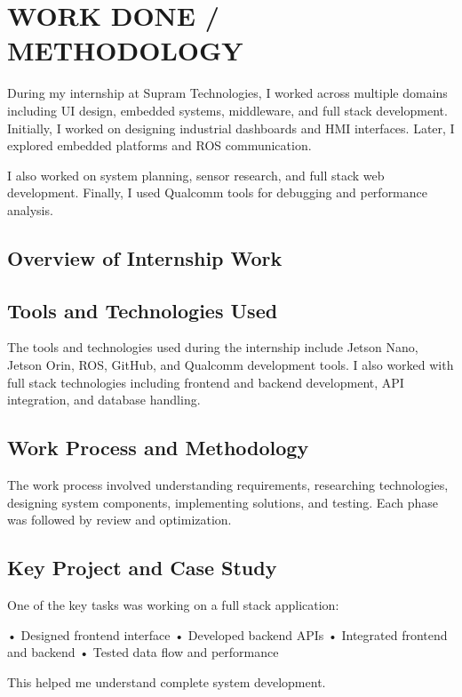 \documentclass[12pt,a4paper]{report}
\begin{document}
\chapter{WORK DONE / METHODOLOGY}


During my internship at Supram Technologies, I worked across multiple domains including UI design, embedded systems, middleware, and full stack development. Initially, I worked on designing industrial dashboards and HMI interfaces. Later, I explored embedded platforms and ROS communication.


I also worked on system planning, sensor research, and full stack web development. Finally, I used Qualcomm tools for debugging and performance analysis.


\section{Overview of Internship Work}


\section{Tools and Technologies Used}

The tools and technologies used during the internship include Jetson Nano, Jetson Orin, ROS, GitHub, and Qualcomm development tools. I also worked with full stack technologies including frontend and backend development, API integration, and database handling.




\section{Work Process and Methodology}

The work process involved understanding requirements, researching technologies, designing system components, implementing solutions, and testing. Each phase was followed by review and optimization.


\section{Key Project and Case Study}

One of the key tasks was working on a full stack application:


• Designed frontend interface • Developed backend APIs • Integrated frontend and backend • Tested data flow and performance


This helped me understand complete system development.
\end{document}
